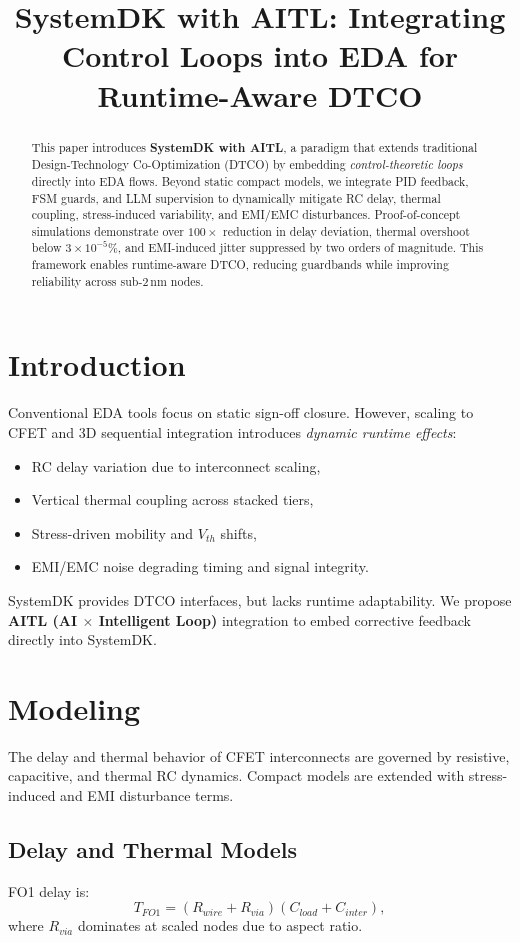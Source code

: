 \documentclass[conference]{IEEEtran}
\title{SystemDK with AITL: Integrating Control Loops into EDA for Runtime-Aware DTCO}
\author{
  \IEEEauthorblockN{Shinichi Samizo}
  \IEEEauthorblockA{Independent Semiconductor Researcher\\
  Email: \href{mailto:shin3t72@gmail.com}{shin3t72@gmail.com}}
}
\begin{document}
\maketitle

\begin{abstract}
This paper introduces \textbf{SystemDK with AITL}, a paradigm that extends 
traditional Design-Technology Co-Optimization (DTCO) by embedding 
\emph{control-theoretic loops} directly into EDA flows. 
Beyond static compact models, we integrate PID feedback, FSM guards, 
and LLM supervision to dynamically mitigate RC delay, thermal coupling, 
stress-induced variability, and EMI/EMC disturbances. 
Proof-of-concept simulations demonstrate over $100\times$ reduction in delay deviation,
thermal overshoot below $3\times 10^{-5}\%$, and EMI-induced jitter suppressed by two orders of magnitude. 
This framework enables runtime-aware DTCO, reducing guardbands while improving reliability across sub-2\,nm nodes.
\end{abstract}

\section{Introduction}
Conventional EDA tools focus on static sign-off closure. 
However, scaling to CFET and 3D sequential integration introduces \emph{dynamic runtime effects}:
\begin{itemize}
  \item RC delay variation due to interconnect scaling,
  \item Vertical thermal coupling across stacked tiers,
  \item Stress-driven mobility and $V_{th}$ shifts,
  \item EMI/EMC noise degrading timing and signal integrity.
\end{itemize}
SystemDK provides DTCO interfaces, but lacks runtime adaptability.
We propose \textbf{AITL (AI $\times$ Intelligent Loop)} integration to embed corrective feedback directly into SystemDK.

\section{Modeling}
The delay and thermal behavior of CFET interconnects are governed by resistive,
capacitive, and thermal RC dynamics. Compact models are extended with
stress-induced and EMI disturbance terms.

\subsection{Delay and Thermal Models}
FO1 delay is:
\begin{equation}
T_{FO1} = (R_{wire}+R_{via})(C_{load}+C_{inter}),
\end{equation}
where $R_{via}$ dominates at scaled nodes due to aspect ratio.  
\end{document}

